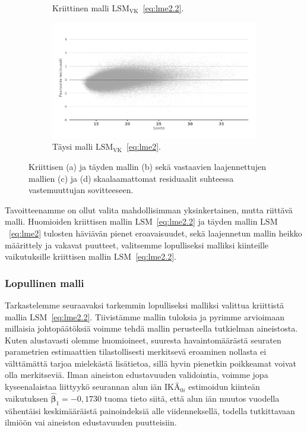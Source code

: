 \documentclass[finnish]{docopts}
\begin{document}
\begin{figure}[H]
\begin{subfigure}[b]{0.4\textwidth}
  \caption{Kriittinen malli $\text{LSM}_{\text{VK}}$~\ref{eq:lme2.2}.}
  \label{fig:lme_vk_krit_fitresid}
\end{subfigure}%
\begin{subfigure}[b]{0.4\textwidth}
\centering
  \includegraphics[width=.8\linewidth]{kuvaajat/lme3_full_vc_fitresid.png}
  \caption{Täysi malli $\text{LSM}_{\text{VK}}$~\ref{eq:lme2}.}
  \label{fig:lme_vk_taysi_fitresid}
\end{subfigure}
 \caption{Kriittisen (a) ja täyden mallin (b) sekä vastaavien laajennettujen mallien (c) ja (d) skaalaamattomat residuaalit suhteessa vastemuuttujan sovitteeseen.}
   \label{fig:lme_fitresid_qq}
\end{figure}

Tavoitteenamme on ollut valita mahdollisimman yksinkertainen, mutta riittävä malli. Huomioiden kriittisen mallin $\text{LSM}$~\ref{eq:lme2.2} ja täyden mallin $\text{LSM}$~\ref{eq:lme2} tulosten häviävän pienet eroavaisuudet, sekä laajennetun mallin heikko määrittely ja vakavat puutteet, valitsemme lopulliseksi malliksi kiinteille vaikutuksille kriittisen mallin $\text{LSM}$~\ref{eq:lme2.2}.\\

\subsubsection{Lopullinen malli}

Tarkastelemme seuraavaksi tarkemmin lopulliseksi malliksi valittua kriittistä mallia $\text{LSM}$~\ref{eq:lme2.2}. Tiivistämme mallin tuloksia ja pyrimme arvioimaan millaisia johtopäätöksiä voimme tehdä mallin perusteella tutkielman aineistosta.\\

Kuten alustavasti olemme huomioineet, suuresta havaintomäärästä seuraten parametrien estimaattien tilastollisesti merkitsevä eroaminen nollasta ei välttämättä tarjoa mielekästä lisätietoa, sillä hyvin pienetkin poikkeamat voivat olla merkitseviä. Ilman aineiston edustavuuden validointia, voimme jopa kyseenalaistaa liittyykö seurannan alun iän $\text{IKÄ}_{0i}$ estimoidun kiinteän vaikutuksen $\hat{\bm{\beta}}_1 = -0,1730$ tuoma tieto siitä, että alun iän muutos vuodella vähentäisi keskimääräistä painoindeksiä alle viidenneksellä, todella tutkittavaan ilmiöön vai aineiston edustavuuden puutteisiin.\\
\end{document}

